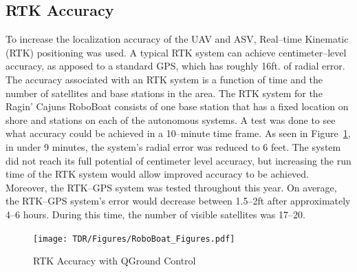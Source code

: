 \documentclass[letterpaper, 12 pt, conference]{ieeeconf}
\begin{document}
% 
\subsection{RTK Accuracy} 
% 
To increase the localization accuracy of the UAV and ASV, Real--time Kinematic (RTK) positioning was used. A typical RTK system can achieve centimeter--level accuracy, as apposed to a standard GPS, which has roughly 16ft. of radial error. The accuracy associated with an RTK system is a function of time and the number of satellites and base stations in the area. The RTK system for the Ragin' Cajuns RoboBoat consists of one base station that has a fixed location on shore and stations on each of the autonomous systems. A test was done to see what accuracy could be achieved in a 10--minute time frame. As seen in Figure~\ref{fig:RTK}, in under 9 minutes, the system's radial error was reduced to 6 feet. The system did not reach its full potential of centimeter level accuracy, but increasing the run time of the RTK system would allow improved accuracy to be achieved. Moreover, the RTK--GPS system was tested throughout this year. On average, the RTK--GPS system's error would decrease between 1.5--2ft after approximately 4--6 hours. During this time, the number of visible satellites was 17--20.
%
\begin{figure}[tb]
\vspace{0.05in}
\centering
\texttt{[image: TDR/Figures/RoboBoat\_Figures.pdf]}
\caption{RTK Accuracy with QGround Control}
\label{fig:RTK}
\end{figure}
% 
\end{document}
